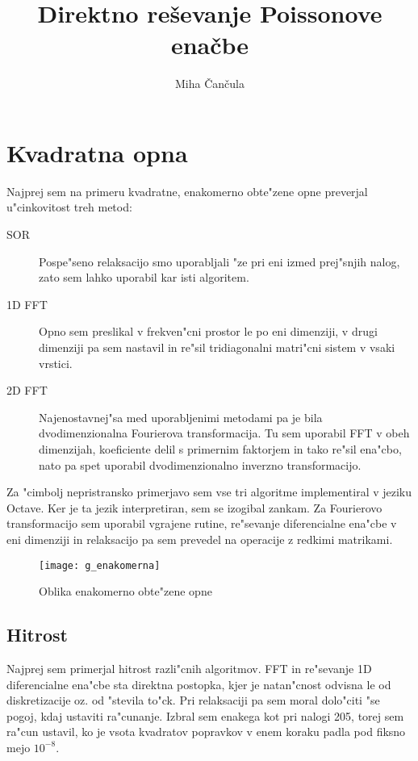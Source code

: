 \documentclass[a4paper,10pt]{article}
\title{Direktno re\v sevanje Poissonove ena\v cbe}
\author{Miha \v Can\v cula}
\begin{document}
\maketitle

\section{Kvadratna opna}

Najprej sem na primeru kvadratne, enakomerno obte"zene opne preverjal u"cinkovitost treh metod:

\begin{description}
  \item[SOR] Pospe"seno relaksacijo smo uporabljali "ze pri eni izmed prej"snjih nalog, zato sem lahko uporabil kar isti algoritem. 
  \item[1D FFT] Opno sem preslikal v frekven"cni prostor le po eni dimenziji, v drugi dimenziji pa sem nastavil in re"sil tridiagonalni matri"cni sistem v vsaki vrstici. 
  \item[2D FFT] Najenostavnej"sa med uporabljenimi metodami pa je bila dvodimenzionalna Fourierova transformacija. Tu sem uporabil FFT v obeh dimenzijah, koeficiente delil s primernim faktorjem in tako re"sil ena"cbo, nato pa spet uporabil dvodimenzionalno inverzno transformacijo. 
  
\end{description}

Za "cimbolj nepristransko primerjavo sem vse tri algoritme implementiral v jeziku Octave. Ker je ta jezik interpretiran, sem se izogibal zankam. Za Fourierovo transformacijo sem uporabil vgrajene rutine, re"sevanje diferencialne ena"cbe v eni dimenziji in relaksacijo pa sem prevedel na operacije z redkimi matrikami. 

\begin{figure}[H]
\centering
 \texttt{[image: g\_enakomerna]}
 \caption{Oblika enakomerno obte"zene opne}
 \label{fig:enakomerna}
\end{figure}

\subsection{Hitrost}

Najprej sem primerjal hitrost razli"cnih algoritmov. FFT in re"sevanje 1D diferencialne ena"cbe sta direktna postopka, kjer je natan"cnost odvisna le od diskretizacije oz. od "stevila to"ck. Pri relaksaciji pa sem moral dolo"citi "se pogoj, kdaj ustaviti ra"cunanje. Izbral sem enakega kot pri nalogi 205, torej sem ra"cun ustavil, ko je vsota kvadratov popravkov v enem koraku padla pod fiksno mejo $10^{-8}$. 
\end{document}
